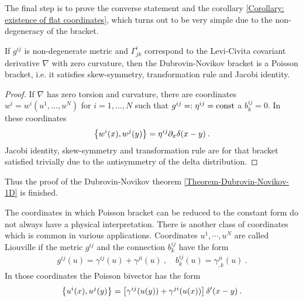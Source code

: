 The final step is to prove the converse statement and the corollary \vref{Corollary: existence of flat coordinates}, which turns out to be very simple due to the non-degeneracy of the bracket. 

\begin{lemma}
    If $g^{ij}$ is non-degenerate metric and $\Gamma^i_{jk}$ correspond to the Levi-Civita covariant derivative $\nabla$ with zero curvature, then the Dubrovin-Novikov bracket is a Poisson bracket, i.e. it satisfies skew-symmetry, transformation rule and Jacobi identity.
\end{lemma}

\begin{proof}
    If $\nabla$ has zero torsion and curvature, there are coordinates $w^i=w^i(u^1,\dots,u^N)$ for $i=1,\dots,N$ such that $g^{ij} =: \eta^{ij} =\mathrm{const}$ a $b^{ij}_k = 0$. In these coordinates
    \begin{align}
        \left \lbrace w^i(x),w^j(y) \right \rbrace = \eta^{ij} \partial_x \delta(x-y) \:.
    \end{align}
    Jacobi identity, skew-symmetry and transformation rule are for that bracket satisfied trivially due to the antisymmetry of the delta distribution.
\end{proof}
Thus the proof of the Dubrovin-Novikov theorem \vref{Theorem-Dubrovin-Novikov-1D} is finished.

The coordinates in which Poisson bracket can be reduced to the constant form do not always have a physical interpretation. There is another class of coordinates which is common in various applications. Coordinates $u^1, \cdots, u^N$ are called Liouville if the metric $g^{ij}$ and the connection $b^{ij}_k$ have the form
\begin{align}
    g^{ij}(u) = \gamma^{ij}(u)+ \gamma^{ji}(u) \:, \quad b^{ij}_k(u) = \gamma^{ji}_{,k}(u) \:. 
\end{align}
In those coordinates the Poisson bivector has the form
\begin{align}
    \left \lbrace u^i(x),u^j(y) \right \rbrace = \left[ \gamma^{ij}(u(y)) + \gamma^{ji}(u(x)) \right] \delta'(x-y) \:.
\end{align}


